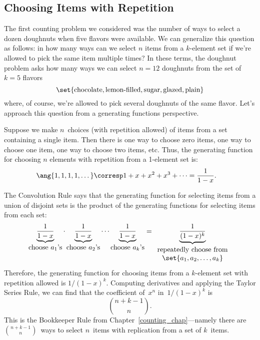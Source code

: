 \subsection{Choosing Items with Repetition}
\label{sec:rep}

The first counting problem we considered was the number of ways to
select a dozen doughnuts when five flavors were available.  We can
generalize this question as follows: in how many ways can we select
$n$ items from a $k$-element set if we're allowed to pick the same
item multiple times?  In these terms, the doughnut problem asks how
many ways we can select $n=12$ doughnuts from the set of $k=5$ flavors
\[
\set{\text{chocolate}, \text{lemon-filled}, \text{sugar}, \text{glazed}, \text{plain}}
\]
%
where, of course, we're allowed to pick several doughnuts of the same
flavor.   Let's approach this question from a generating functions
perspective.

Suppose we make $n$~choices (with repetition allowed) of items from a set
containing a single item.  Then there is one way to choose zero items, one
way to choose one item, one way to choose two items, etc.  Thus, the
generating function for choosing $n$ elements with repetition from a
1-element set is:
%
\begin{align*}
\ang{1, 1, 1, 1, \dots}
     & \corresp  1 + x + x^2 + x^3 + \cdots %
 =  \frac{1}{1-x}.
\end{align*}

The Convolution Rule says that the generating function for selecting
items from a union of disjoint sets is the product of the generating
functions for selecting items from each set:
%
\[
\underbrace{\frac{1}{1-x}}_{\textstyle\text{choose $a_1$'s}}
\cdot
\underbrace{\frac{1}{1-x}}_{\textstyle\text{choose $a_2$'s}}
\cdots
\underbrace{\frac{1}{1-x}}_{\textstyle\text{choose $a_k$'s}}
=
\underbrace{\frac{1}{(1-x)^k}}_{
\begin{array}{cc}
\text{repeatedly choose from} \\
\set{a_1, a_2, \dots, a_k}
\end{array}}
\]
%
Therefore, the generating function for choosing items from a
$k$-element set with repetition allowed is $1 / (1 - x)^k$.  Computing
derivatives and applying the Taylor Series Rule, we can find that the
coefficient of~$x^n$ in~$1 / (1 - x)^k$ is
\[
    \binom{n+k-1}{n}.
\]
This is the Bookkeeper Rule from Chapter~\ref{counting_chap}---namely
there are $\binom{n + k - 1}{n}$~ways to select $n$~items with
replication from a set of $k$~items.


